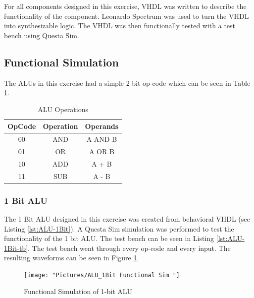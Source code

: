\documentclass[11pt]{article}
\begin{document}
	For all components designed in this exercise, VHDL was written to describe the functionality of the component. Leonardo Spectrum was used to turn the VHDL into synthesizable logic. The VHDL was then functionally tested with a test bench using Questa Sim. 
	
	

	\subsection{Functional Simulation}
	
		The ALUs in this exercise had a simple 2 bit op-code which can be seen in Table \ref{tab:OpCodes}.
	
		\begin{table}[H]
			\centering
			\caption{ALU Operations}
			\label{tab:OpCodes}
			\begin{tabular}{|ccc|}
				\hline
				\textbf{OpCode} & \textbf{Operation} & \textbf{Operands} \\
				\hline
				00              & AND                & A AND B           \\
				01              & OR                 & A OR B            \\
				10              & ADD                & A + B             \\
				11              & SUB                & A - B   \\   
				\hline       
			\end{tabular}
		\end{table}
	
		\subsubsection{1 Bit ALU}
		
			The 1 Bit ALU designed in this exercise was created from behavioral VHDL (see Listing \ref{lst:ALU-1Bit}). A Questa Sim simulation was performed to test the functionality of the 1 bit ALU. The test bench can be seen in Listing \ref{lst:ALU-1Bit-tb}. The test bench went through every op-code and every input. The resulting waveforms can be seen in Figure \ref{fig:alu1bit-functional-sim-}.
		
			\begin{figure}[H]
				\centering
				\texttt{[image: "Pictures/ALU\_1Bit Functional Sim "]}
				\caption{Functional Simulation of 1-bit ALU}
				\label{fig:alu1bit-functional-sim-}
			\end{figure}
		
\end{document}
